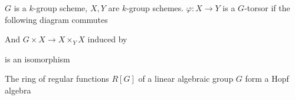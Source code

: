 \documentclass[main]{subfiles}
\begin{document}
\begin{definition}
$G$ is a $k$-group scheme, $X,Y$ are $k$-group schemes. $\varphi:X\to Y$ is a $G$-torsor if the following diagram commutes
\begin{center}
\end{center}
And $G\times X\to X\times_YX$ induced by
is an isomorphism
\end{definition}

\begin{proposition}
The ring of regular functions $R[G]$ of a linear algebraic group $G$ form a Hopf algebra
\end{proposition}
\end{document}
